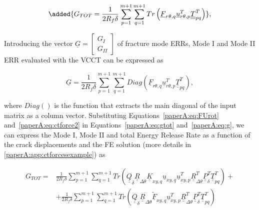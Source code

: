 \begin{equation}\label{paperA:eq:gtot}
\added{G_{TOT} = \frac{1}{2R_{f}\delta}\sum_{p=1}^{m+1}\sum_{q=1}^{m+1}Tr\left(\underline{F}_{r\theta,q}\underline{u}_{r\theta,p}^{T}\underline{\underline{T}}_{pq}^{T}\right)},
\end{equation}

 Introducing the vector $\underline{G}=\begin{bmatrix}
G_{I} \\
G_{II}
\end{bmatrix}$ of fracture mode ERRs, Mode I and Mode II ERR evaluated with the VCCT can be expressed as

\begin{equation}\label{paperA:eq:g}
\underline{G} =\frac{1}{2R_{f}\delta}\sum_{p=1}^{m+1}\sum_{q=1}^{m+1}Diag\left(\underline{F}_{r\theta,q}\underline{u}_{r\theta,p}^{T}\underline{\underline{T}}_{pq}^{T}\right),
\end{equation}

where $Diag\left(\right)$ is the function that extracts the main diagonal of the input matrix as a column vector. Substituting Equations~\ref{paperA:eq:FUrot} and~\ref{paperA:eq:ctforce2} in Equations~\ref{paperA:eq:gtot} and~\ref{paperA:eq:g}, we can express the Mode I, Mode II and total Energy Release Rate as a function of the crack displacements and the FE solution (more details in \ref{paperA:app:ctforcesexample}) as

\begin{equation}\label{paperA:eq:gtotlong}
\begin{split}
G_{TOT} =&\frac{1}{2R_{f}\delta}\sum_{p=1}^{m+1}\sum_{q=1}^{m+1}Tr\left(\underline{\underline{Q}}_{\delta}\underline{\underline{R}}_{\Delta\theta}\underline{\underline{K}}_{xy,q}\underline{u}_{xy,q}\underline{u}_{xy,p}^{T}\underline{\underline{R}}_{\Delta\theta}^{T}\underline{\underline{P}}_{\delta}^{T}\underline{\underline{T}}_{pq}^{T}\right)+\\&+\frac{1}{2R_{f}\delta}\sum_{p=1}^{m+1}\sum_{q=1}^{m+1}Tr\left(\underline{\underline{Q}}_{\delta}\underline{\underline{R}}_{\Delta\theta}\underline{\widetilde{F}}_{xy,q}\underline{u}_{xy,p}^{T}\underline{\underline{R}}_{\Delta\theta}^{T}\underline{\underline{P}}_{\delta}^{T}\underline{\underline{T}}_{pq}^{T}\right)
\end{split}
\end{equation}


